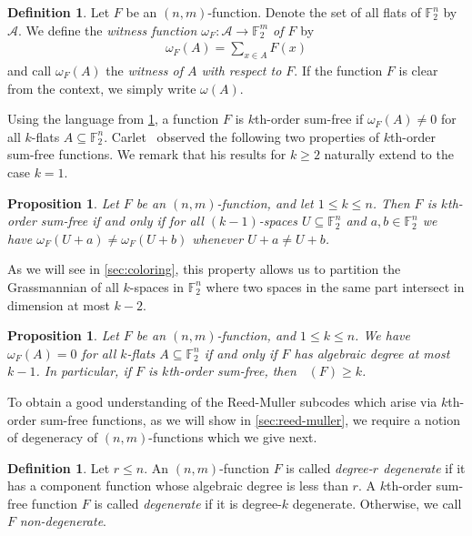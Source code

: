 \documentclass[12pt]{article}
\newtheorem{prop}[thm]{Proposition}
\theoremstyle{definition}
\newtheorem{defn}[thm]{Definition}
\newcommand{\A}{\mathcal A}
\newcommand{\F}{\mathbb F}
\newcommand{\Fpnv}{\mathbb{F}_2^n}
\newcommand{\Fpmv}{\mathbb{F}_2^m}
\DeclareMathOperator{\degalg}{\deg_{{alg}}}
\begin{document}
\begin{defn}
\label{Notation: Witness}
    Let $F$ be an $(n,m)$-function. Denote the set of all flats of $\Fpnv$ by $\A$. We define the \emph{witness function $\omega_F \colon \A \to \Fpmv$ of $F$} by 
    \begin{align*}
        \omega_F(A)=\sum_{x\in A} F(x)
    \end{align*}
    and call $\omega_F(A)$ the \emph{witness of $A$ with respect to $F$}.
    If the function $F$ is clear from the context, we simply write $\omega(A)$.
\end{defn}

Using the language from \cref{Notation: Witness}, a function $F$ is $k$th-order sum-free if $\omega_F(A)\ne 0$ for all $k$-flats $A \subseteq \Fpnv$. Carlet~\cite{carlet2025generalizations} observed the following two properties of $k$th-order sum-free functions. We remark that his results for $k\ge 2$ naturally extend to the case $k=1$.

\begin{prop}
\label{prop:k-1_flats}
    Let $F$ be an $(n,m)$-function, and let $1\le k\le n$. Then $F$ is $k$th-order sum-free if and only if for all $(k-1)$-spaces $U \subseteq \F_2^n$ and $a, b \in \F_{2}^n$ we have $\omega_F(U+a) \neq \omega_F(U+b)$ whenever $U+a \neq U+b$.
\end{prop}
As we will see in \cref{sec:coloring}, this property allows us to partition the Grassmannian of all $k$-spaces in $\F_2^n$ where two spaces in the same part intersect in dimension at most $k-2$.



\begin{prop}
\label{prop:degree<k}
    Let $F$ be an $(n,m)$-function, and $1\le k\le n$. We have $\omega_F(A)=0$ for all $k$-flats $A\subseteq\Fpnv$ if and only if $F$ has algebraic degree at most $k-1$. In particular, if $F$ is $k$th-order sum-free, then $\degalg(F)\ge k$. 
\end{prop}



To obtain a good understanding of the Reed-Muller subcodes which arise via $k$th-order sum-free functions, as we will show in \cref{sec:reed-muller}, we require a notion of degeneracy of $(n, m)$-functions which we give next.



\begin{defn}
    Let $r\le n$. An $(n, m)$-function $F$ is called \textit{degree-$r$ degenerate} if it has a component function whose algebraic degree is less than $r$. A $k$th-order sum-free function $F$ is called \textit{degenerate} if it is degree-$k$ degenerate. Otherwise, we call $F$ \textit{non-degenerate}.
\end{defn}
\end{document}
